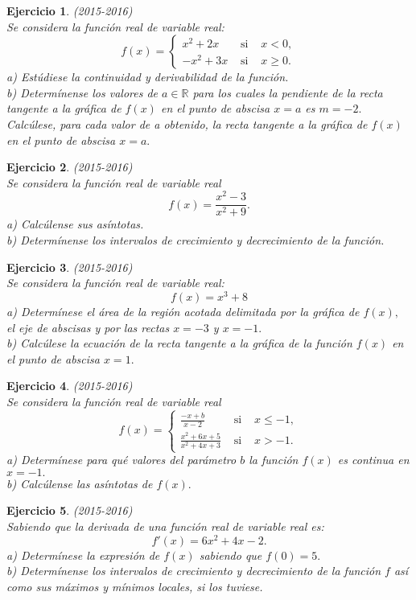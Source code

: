\documentclass[12pt, a4paper]{amsart}
\newtheorem{ejer}{Ejercicio}
\begin{document}
\begin{ejer}\em (2015-2016)\\
Se considera la función real de variable real:
\[f(x)=\left \{ \begin{matrix}
x^2+2x & \text{ si } & x<0,\\
-x^2+3x & \text{ si } & x\geq 0.
\end{matrix}\right.\]
a) Estúdiese la continuidad y derivabilidad de la función.\\
b) Determínense los valores de $a\in\mathbb{R}$ para los cuales la pendiente de la recta tangente a la gráfica de $f (x)$ en el punto de abscisa $x = a$ es $m = -2.$ Calcúlese, para cada valor de a obtenido, la recta tangente a la gráfica de $f (x)$ en el punto de abscisa $x = a.$
\end{ejer}

\begin{ejer}\em (2015-2016)\\
Se considera la función real de variable real
\[f(x)=\frac{x^2-3}{x^2+9}.\]
a) Calcúlense sus asíntotas.\\
b) Determínense los intervalos de crecimiento y decrecimiento de la función.
\end{ejer}

\begin{ejer}\em (2015-2016)\\
Se considera la función real de variable real:
\[f(x)=x^3+8\]
a) Determínese el área de la región acotada delimitada por la gráfica de $f(x),$ el eje de abscisas y por las rectas $x = - 3$ y $x = - 1.$\\
b) Calcúlese la ecuación de la recta tangente a la gráfica de la función $f(x)$ en el punto de abscisa $x = 1.$
\end{ejer}

\begin{ejer}\em (2015-2016)\\
Se considera la función real de variable real
\[f(x)=\left \{ \begin{matrix}
\frac{-x+b}{x-2} & \text{ si } & x\leq -1,\\
\frac{x^2+6x+5}{x^2+4x+3} & \text{ si } & x>-1.
\end{matrix}\right.\]
a) Determínese para qué valores del parámetro $b$ la función $f(x)$ es continua en $x = -1.$\\
b) Calcúlense las asíntotas de $f(x).$
\end{ejer}

\begin{ejer}\em (2015-2016)\\
Sabiendo que la derivada de una función real de variable real es:
\[f'(x)=6x^2+4x-2.\]
a) Determínese la expresión de $f(x)$ sabiendo que $f (0) = 5.$\\
b) Determínense los intervalos de crecimiento y decrecimiento de la función $f$ así como sus máximos y mínimos locales, si los tuviese.
\end{ejer}
\end{document}
